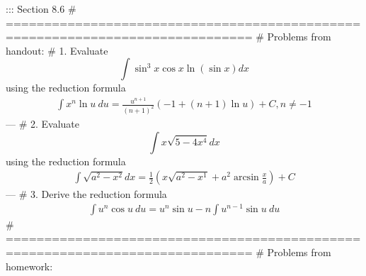 ::: Section 8.6
# ==============================================================================
# Problems from handout:
# 1.
Evaluate
\[\int\sin^3 x\cos x\ln(\sin x)dx\]
using the reduction formula
\begin{gather*}
\int x^n\ln u\ du=\frac{u^{n+1}}{(n+1)^2}(-1+(n+1)\ln u)+C,n\neq -1
\end{gather*}
---
# 2.
Evaluate
\[\int x\sqrt{5-4x^4}dx\]
using the reduction formula
\begin{gather*}
\int\sqrt{a^2-x^2}dx=\frac{1}{2}\left(x\sqrt{a^2-x^1}+a^2\arcsin\frac{x}{a}\right)+C
\end{gather*}
---
# 3.
Derive the reduction formula
\begin{gather*}
\int u^n\cos u\ du=u^n\sin u-n\int u^{n-1}\sin u\ du
\end{gather*}
# ==============================================================================
# Problems from homework:
